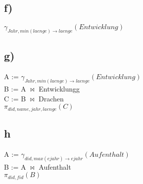 \documentclass{article}
\begin{document}
	\subsection*{f)}
	$\gamma_{Jahr, min(laenge) \to laenge}(Entwicklung)$
	\subsection*{g)}
	A := $\gamma_{Jahr, min(laenge) \to laenge}(Entwicklung)$ \\
	B := A $\bowtie$ Entwicklungg \\
	C := B $\bowtie$ Drachen \\
	$\pi_{did,name,jahr,laenge}(C)$
	\subsection*{h}
	A := $\gamma_{did, max(ejahr) \to ejahr}(Aufenthalt)$ \\
	B := A $\bowtie$ Aufenthalt \\
	$\pi_{did, fid}(B)$
\end{document}

